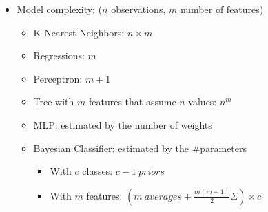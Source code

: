 \documentclass[twocolumn, 10pt]{article}
\begin{document}
\begin{itemize}[leftmargin=*, itemsep=0pt]
\begin{itemize}[topsep=0pt, itemsep=0pt]
    \end{itemize}

    \item Model complexity: ($n$ observations, $m$ number of features)
    \begin{itemize}[topsep=0pt, itemsep=0pt]
        \item K-Nearest Neighbors: $n\times m$
        \item Regressions: $m$
        \item Perceptron: $m+1$
        \item Tree with $m$ features that assume $n$ values: $\displaystyle n^m$
        \item MLP: estimated by the number of weights
        \item Bayesian Classifier: estimated by the \#parameters
        \begin{itemize}[topsep=0pt, itemsep=0pt]
            \item With $c$ classes: $c-1\ priors$
            \item With $m$ features: $\displaystyle (m\ averages+\frac{m(m+1)}{2}\Sigma)\times c$
        \end{itemize}
    \end{itemize}

\end{itemize}
\end{document}
